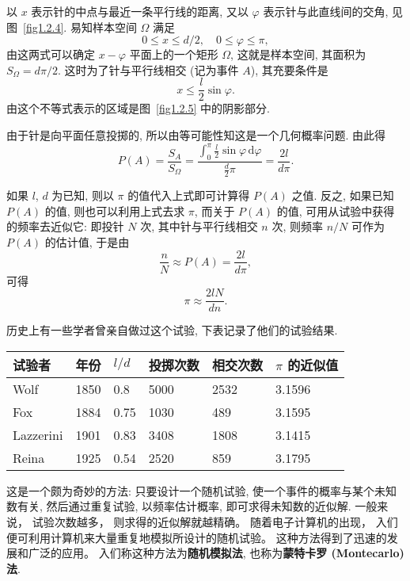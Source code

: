 \begin{solution}
  以 $x$ 表示针的中点与最近一条平行线的距离,
  又以 $\varphi$ 表示针与此直线间的交角,
  见图~\ref{fig1.2.4}.
  易知样本空间 $\Omega$ 满足
  \[
    0 \le x \le d/2, \quad 0 \le \varphi \le \pi,
  \]
  由这两式可以确定 $x - \varphi$ 平面上的一个矩形 $\Omega$,
  这就是样本空间,
  其面积为 $S_\Omega = d\pi/2$.
  这时为了针与平行线相交 (记为事件 $A$),
  其充要条件是
  \[
    x \le \frac{l}{2} \sin \varphi.
  \]
  由这个不等式表示的区域是图~\ref{fig1.2.5} 中的阴影部分.

  由于针是向平面任意投掷的,
  所以由等可能性知这是一个几何概率问题.
  由此得
  \[
    P (A) = \frac{S_A}{S_\Omega}
    = \frac{\int_0^\pi \frac{l}{2} \sin \varphi \, \mathrm{d} \varphi}{\frac{d}{2} \pi}
    = \frac{2l}{d\pi}.
  \]

  如果 $l$, $d$ 为已知,
  则以 $\pi$ 的值代入上式即可计算得 $P(A)$ 之值.
  反之,
  如果已知 $P(A)$ 的值,
  则也可以利用上式去求 $\pi$,
  而关于 $P(A)$ 的值,
  可用从试验中获得的频率去近似它:
  即投针 $N$ 次,
  其中针与平行线相交 $n$ 次,
  则频率 $n/N$ 可作为 $P(A)$ 的估计值,
  于是由
  \[
    \frac{n}{N} \approx P (A) = \frac{2l}{d\pi},
  \]
  可得
  \[
    \pi \approx \frac{2lN}{dn}.
  \]

  历史上有一些学者曾亲自做过这个试验,
  下表记录了他们的试验结果.

  \begin{tabularx}{0.9\linewidth}{*{6}{Z}}
    \toprule
    试验者 & 年份 & $l/d$ & 投掷次数 & 相交次数 & $\pi$ 的近似值\\
    \midrule
    Wolf & 1850 & 0.8 & 5000 & 2532 & 3.1596\\
    Fox & 1884 & 0.75 & 1030 & 489 & 3.1595\\
    Lazzerini & 1901 & 0.83 & 3408 & 1808 & 3.1415\\
    Reina & 1925 & 0.54 & 2520 & 859 & 3.1795\\
    \bottomrule
  \end{tabularx}

  这是一个颇为奇妙的方法:
  只要设计一个随机试验,
  使一个事件的概率与某个未知数有关,
  然后通过重复试验,
  以频率估计概率,
  即可求得未知数的近似解.
  一般来说，
  试验次数越多，
  则求得的近似解就越精确。
  随着电子计算机的出现，
  入们便可利用计算机来大量重复地模拟所设计的随机试验。
  这种方法得到了迅速的发展和广泛的应用。
  入们称这种方法为\textbf{随机模拟法},
  也称为\textbf{蒙特卡罗 (Montecarlo) 法}.
\end{solution}

